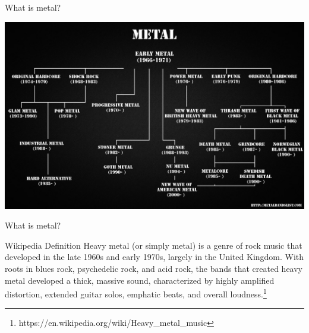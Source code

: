 \documentclass{beamer}
\begin{document}
    \begin{frame}{What is metal?}
      \pause
      \begin{center}
        \includegraphics[scale=.18]{familyTree}
      \end{center}
    \end{frame}

    \begin{frame}{What is metal?}

      \begin{block}{Wikipedia Definition}
        Heavy metal (or simply metal) is a genre of rock music that developed in the late 1960s
        and early 1970s, largely in the United Kingdom. With roots in blues rock, psychedelic rock,
        and acid rock, the bands that created heavy metal developed a thick, massive sound,
        characterized by highly amplified distortion, extended guitar solos, emphatic beats,
        and overall loudness.\footnote{https://en.wikipedia.org/wiki/Heavy\_metal\_music}
      \end{block}

    \end{frame}
    
\end{document}
